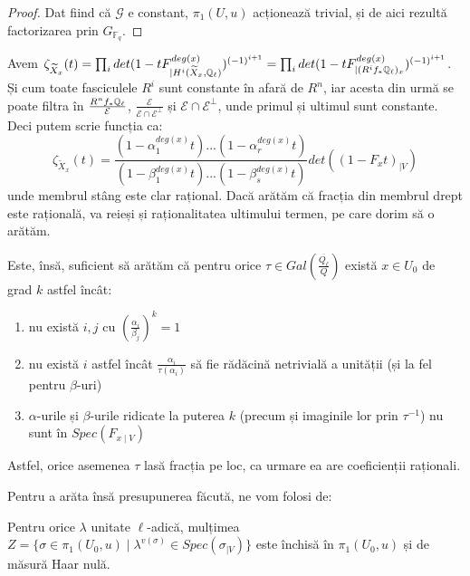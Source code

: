\documentclass[13pt,openany]{book}
\begin{document}
\begin{proof}
Dat fiind că $\mathcal{G}$ e constant, $\pi_1(U,u)$ acționează trivial, și de aici rezultă factorizarea prin $G_{\mathbb{F}_q}$.
\end{proof}

Avem $\zeta_{\widetilde{X}_x}(t)=\prod_i det(1-tF^{deg(x)}_{\mid H^i(\widetilde{X}_x,\mathbb{Q}_\ell)})^{(-1)^{i+1}}=\prod_i det(1-tF^{deg(x)}_{\mid (R^i f_* \mathbb{Q}_\ell)_x})^{(-1)^{i+1}}$. Și cum toate fasciculele $R^i$ sunt constante în afară de $R^n$, iar acesta din urmă se poate filtra în $\frac{R^n f_* \mathbb{Q}_\ell}{\mathcal{E}}$, $\frac{\mathcal{E}}{\mathcal{E} \cap \mathcal{E}^\perp}$ și $\mathcal{E} \cap \mathcal{E}^\perp$, unde primul și ultimul sunt constante. Deci putem scrie funcția ca:
$$\zeta_{\widetilde{X}_x}(t)=\frac{(1-\alpha_1^{deg(x)}t)...(1-\alpha_r^{deg(x)}t)}{(1-\beta_1^{deg(x)}t)...(1-\beta_s^{deg(x)}t)}det((1-F_xt)_{\mid V})$$
unde membrul stâng este clar rațional. Dacă arătăm că fracția din membrul drept este rațională, va reieși și raționalitatea ultimului termen, pe care dorim să o arătăm.

Este, însă, suficient să arătăm că pentru orice $\tau \in Gal(\frac{\overline{Q_\ell}}{Q})$ există $x \in U_0$ de grad $k$ astfel încât:
\begin{enumerate}
\item nu există $i,j$ cu $(\frac{\alpha_i}{\beta_j})^k=1$
\item nu există $i$ astfel încât $\frac{\alpha_i}{\tau(\alpha_i)}$ să fie rădăcină netrivială a unității (și la fel pentru $\beta$-uri)
\item $\alpha$-urile și $\beta$-urile ridicate la puterea $k$ (precum și imaginile lor prin $\tau^{-1}$) nu sunt în $Spec(F_{x\mid V})$
\end{enumerate}
Astfel, orice asemenea $\tau$ lasă fracția pe loc, ca urmare ea are coeficienții raționali.

Pentru a arăta însă presupunerea făcută, ne vom folosi de:

\begin{prop}
Pentru orice $\lambda$ unitate $\ell$-adică, mulțimea $Z=\{\sigma \in \pi_1(U_0,u) \mid \lambda^{v(\sigma)} \in Spec(\sigma_{\mid V})\}$ este închisă în $\pi_1(U_0,u)$ și de măsură Haar nulă.
\end{prop}
\end{document}
